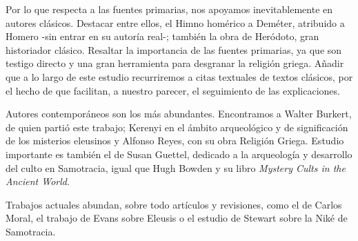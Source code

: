 Por lo que respecta a las fuentes primarias, nos apoyamos inevitablemente en autores clásicos. Destacar entre ellos, el Himno homérico a Deméter, atribuido a Homero -sin entrar en su autoría real-; también la obra de Heródoto, gran historiador clásico. Resaltar la importancia de las fuentes primarias, ya que son testigo directo y una gran herramienta para desgranar la religión griega. Añadir que a lo largo de este estudio recurriremos a citas textuales de textos clásicos, por el hecho de que facilitan, a nuestro parecer, el seguimiento de las explicaciones. 

Autores contemporáneos son los más abundantes. Encontramos a Walter Burkert, de quien partió este trabajo; Kerenyi en el ámbito arqueológico y de significación de los misterios eleusinos y Alfonso Reyes, con su obra Religión Griega. Estudio importante es también el de Susan Guettel, dedicado a la arqueología y desarrollo del culto en Samotracia, igual que Hugh Bowden y su libro \textit{Mystery Cults in the Ancient World}. 

Trabajos actuales abundan, sobre todo artículos y revisiones, como el de Carlos Moral, el trabajo de Evans sobre Eleusis o el estudio de Stewart sobre la Niké de Samotracia.


